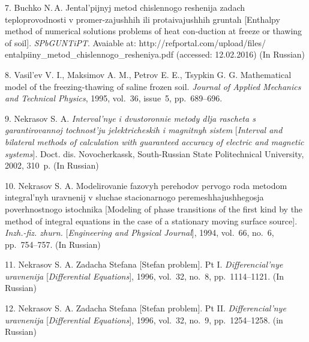 {7. Buchko N.\,A. Jental'pijnyj metod chislennogo reshenija zadach
teploprovodnosti v promer-\linebreak zajushhih ili protaivajushhih
gruntah [Enthalpy method of numerical solutions problems of heat
con-\linebreak duction at freeze or thawing of soil]. {\it
SPbGUNTiPT}. Avaiable at: http://refportal.com/upload/files/
entalpiiny\_metod\_chislennogo\_resheniya.pdf (accessed:
12.02.2016)
    (In Russian)

8. Vasil'ev V. I., Maksimov A. M., Petrov E. E., Tsypkin G. G.
Mathematical model of the freezing-thawing of saline frozen soil.
\textit{Journal of Applied Mechanics and Technical Physics}, 1995,
vol.~36, issue~5, pp.~689--696.

9. Nekrasov S. A. {\it Interval'nye i dvustoronnie metody dlja
rascheta s garantirovannoj tochnost'ju jelektricheskih i magnitnyh
sistem} [{\it Interval and bilateral methods of calculation with
guaranteed accuracy of electric and magnetic systems}]. Doct. dis.
Novocherkassk, South-Russian State Politechnical University, 2002,
310~p. (In Russian)

10. Nekrasov S. A. Modelirovanie fazovyh perehodov pervogo roda
metodom integral'nyh uravnenij v sluchae stacionarnogo
peremeshhajushhegosja poverhnostnogo istochnika [Modeling of phase
transitions of the first kind by the method of integral equations
in the case of a stationary moving surface source]. {\it
Inzh.-fiz. zhurn.} [\textit{Engineering and Physical Journal}],
1994, vol.~66, no.~6, pp.~754--757. (In Russian)

11. Nekrasov S. A. Zadacha Stefana [Stefan problem]. Pt I. {\it
Differencial'nye uravnenija} [\textit{Differential Equations}],
1996, vol.~32, no.~8, pp.~1114--1121. (In Russian)

12. Nekrasov S. A. Zadacha Stefana [Stefan problem]. Pt II. {\it
Differencial'nye uravnenija} [\textit{Differential Equations}],
1996, vol.~32, no.~9, pp.~1254--1258. (in Russian)






}

